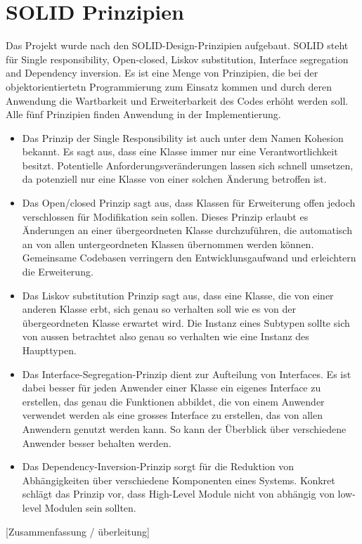 



\section{SOLID Prinzipien}

Das Projekt wurde nach den SOLID-Design-Prinzipien \cite{unclebob1995} aufgebaut. SOLID steht für Single responsibility, Open-closed, Liskov substitution, Interface segregation and Dependency inversion. Es ist eine Menge von Prinzipien, die bei der objektorientiertetn Programmierung zum Einsatz kommen und durch deren Anwendung die Wartbarkeit und Erweiterbarkeit des Codes erhöht werden soll. Alle fünf Prinzipien finden Anwendung in der Implementierung.

\begin{itemize}
\item Das Prinzip der Single Responsibility  ist auch unter dem Namen Kohesion bekannt. Es sagt aus, dass eine Klasse immer nur eine Verantwortlichkeit besitzt.  Potentielle Anforderungsveränderungen lassen sich schnell umsetzen, da potenziell nur eine Klasse von einer solchen Änderung betroffen ist.

\item Das Open/closed Prinzip sagt aus, dass Klassen für Erweiterung offen jedoch verschlossen für Modifikation sein sollen. Dieses Prinzip erlaubt es Änderungen an einer übergeordneten Klasse durchzuführen, die automatisch an von allen untergeordneten Klassen übernommen werden können. Gemeinsame Codebasen verringern den Entwicklunsgaufwand und erleichtern die Erweiterung.

\item Das Liskov substitution Prinzip sagt aus, dass eine Klasse, die von einer anderen Klasse erbt, sich genau so verhalten soll wie es von der übergeordneten Klasse erwartet wird. Die Instanz eines Subtypen sollte sich von aussen betrachtet also genau so verhalten wie eine Instanz des Haupttypen.

\item Das Interface-Segregation-Prinzip dient zur Aufteilung von Interfaces. Es ist dabei besser für jeden Anwender einer Klasse ein eigenes Interface zu erstellen, das genau die Funktionen abbildet, die von einem Anwender verwendet werden als eine grosses Interface zu erstellen, das von allen Anwendern genutzt werden kann. So kann der Überblick über verschiedene Anwender besser behalten werden.

\item Das Dependency-Inversion-Prinzip sorgt für die Reduktion von Abhängigkeiten über verschiedene Komponenten eines Systems. Konkret schlägt das Prinzip vor, dass High-Level Module nicht von abhängig von low-level Modulen sein sollten.

\end{itemize}

[Zusammenfassung / überleitung]
